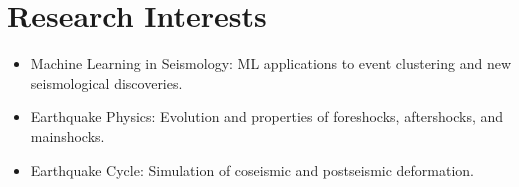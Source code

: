 \section{Research Interests}

\begin{itemize}
\raggedright
\item Machine Learning in Seismology: ML applications to event clustering and new seismological discoveries.
\item Earthquake Physics: Evolution and properties of foreshocks, aftershocks, and mainshocks.
\item Earthquake Cycle: Simulation of coseismic and postseismic deformation.
\end{itemize}
